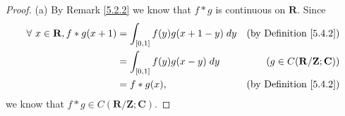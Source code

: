\begin{proof}{(a)}
    By Remark \ref{5.2.2} we know that \(f * g\) is continuous on \(\mathbf{R}\).
    Since
    \begin{align*}
        \forall\ x \in \mathbf{R}, f * g(x + 1) & = \int_{[0, 1]} f(y) g(x + 1 - y) \; dy & \text{(by Definition \ref{5.4.2})}              \\
                                                & = \int_{[0, 1]} f(y) g(x - y) \; dy     & (g \in C(\mathbf{R} / \mathbf{Z} ; \mathbf{C})) \\
                                                & = f * g(x),                             & \text{(by Definition \ref{5.4.2})}
    \end{align*}
    we know that \(f * g \in C(\mathbf{R} / \mathbf{Z} ; \mathbf{C})\).
\end{proof}


